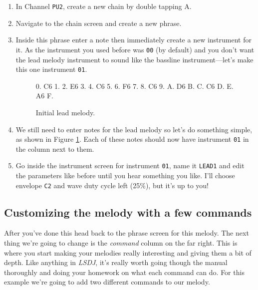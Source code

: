 \documentclass[]{article}
\newcommand{\buttonStyle}[1]{\textsf{#1}\xspace}
\newcommand{\bA}{\buttonStyle{A}}
\newcommand{\gbtxt}[1]{\texttt{#1}\xspace}
\newcommand{\lsdj}{\textit{LSDJ}\xspace}
\begin{document}
\begin{enumerate}	

\item In Channel \gbtxt{PU2}, create a new chain by double tapping \bA.

\item Navigate to the chain screen and create a new phrase.

\item Inside this phrase enter a note then immediately create a new instrument for it. As the instrument you used before was \gbtxt{00} (by default) and you don't want the lead melody instrument to sound like the bassline instrument---let's make this one instrument \gbtxt{01}.

\begin{figure}
\begin{notes}
0. C6
1.
2. E6
3.
4. C6
5.
6. F6
7.
8. C6
9.
A. D6
B.
C. C6
D.
E. A6
F.
\end{notes}
\caption{Initial lead melody.}\label{melody}%
\end{figure}

\item We still need to enter notes for the lead melody so let's do something simple, as shown in Figure \ref{melody}. Each of these notes should now have instrument \gbtxt{01} in the column next to them.

\item Go inside the instrument screen for instrument \gbtxt{01}, name it \gbtxt{LEAD1} and edit the parameters like before until you hear something you like. I'll choose envelope \gbtxt{C2} and wave duty cycle left (25\%), but it's up to you!

\end{enumerate}



\subsection{Customizing the melody with a few commands}

After you've done this head back to the phrase screen for this melody. The next thing we're going to change is the \textit{command} column on the far right. This is where you start making your melodies really interesting and giving them a bit of depth. Like anything in \lsdj, it's really worth going though the manual thoroughly and doing your homework on what each command can do. For this example we're going to add two different commands to our melody.
\end{document}
